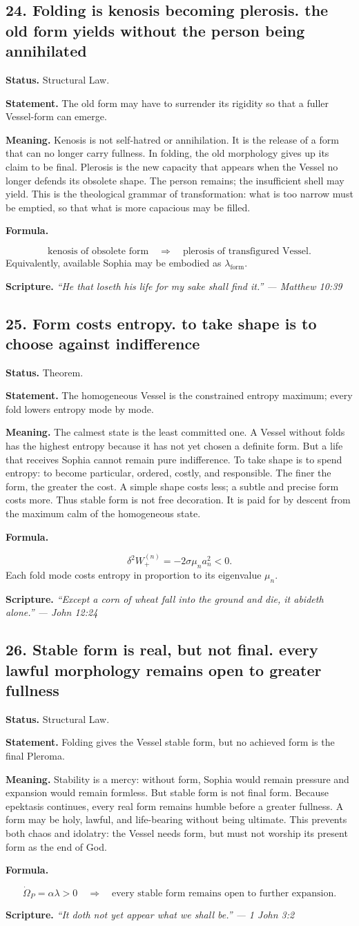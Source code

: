 \documentclass[11pt]{article}
\newcommand{\Op}{\Omega_P}
\newcommand{\lform}{\lambda_{\mathrm{form}}}
\newcommand{\thesis}[2]{%
  \subsection*{#1. #2}%
}
\newcommand{\status}[1]{\textbf{Status.} #1\par}
\newcommand{\statement}[1]{\textbf{Statement.} #1\par}
\newcommand{\explain}[1]{\textbf{Meaning.} #1\par}
\newcommand{\formula}[1]{\textbf{Formula.}\par #1\par}
\newcommand{\scripture}[2]{\textbf{Scripture.} {\small\itshape ``#1'' --- #2}\par}
\begin{document}
\thesis{24}{Folding is kenosis becoming plerosis. the old form yields without the person being annihilated}
\status{Structural Law.}
\statement{The old form may have to surrender its rigidity so that a fuller Vessel-form can emerge.}
\explain{Kenosis is not self-hatred or annihilation. It is the release of a form that can no longer carry fullness. In folding, the old morphology gives up its claim to be final. Plerosis is the new capacity that appears when the Vessel no longer defends its obsolete shape. The person remains; the insufficient shell may yield. This is the theological grammar of transformation: what is too narrow must be emptied, so that what is more capacious may be filled.}
\formula{\[
  \text{kenosis of obsolete form}
  \quad\Longrightarrow\quad
  \text{plerosis of transfigured Vessel}.
\]
Equivalently, available Sophia may be embodied as \(\lform\).}
\scripture{He that loseth his life for my sake shall find it.}{Matthew 10:39}


\thesis{25}{Form costs entropy. to take shape is to choose against indifference}
\status{Theorem.}
\statement{The homogeneous Vessel is the constrained entropy maximum; every fold lowers entropy mode by mode.}
\explain{The calmest state is the least committed one. A Vessel without folds has the highest entropy because it has not yet chosen a definite form. But a life that receives Sophia cannot remain pure indifference. To take shape is to spend entropy: to become particular, ordered, costly, and responsible. The finer the form, the greater the cost. A simple shape costs less; a subtle and precise form costs more. Thus stable form is not free decoration. It is paid for by descent from the maximum calm of the homogeneous state.}
\formula{\[
  \delta^2 W^{(n)}_+=-2\sigma\mu_n a_n^2<0.
\]
Each fold mode costs entropy in proportion to its eigenvalue \(\mu_n\).}
\scripture{Except a corn of wheat fall into the ground and die, it abideth alone.}{John 12:24}

\thesis{26}{Stable form is real, but not final. every lawful morphology remains open to greater fullness}
\status{Structural Law.}
\statement{Folding gives the Vessel stable form, but no achieved form is the final Pleroma.}
\explain{Stability is a mercy: without form, Sophia would remain pressure and expansion would remain formless. But stable form is not final form. Because epektasis continues, every real form remains humble before a greater fullness. A form may be holy, lawful, and life-bearing without being ultimate. This prevents both chaos and idolatry: the Vessel needs form, but must not worship its present form as the end of God.}
\formula{\[
  \dot\Op=\alpha\lambda>0
  \quad\Longrightarrow\quad
  \text{every stable form remains open to further expansion.}
\]}
\scripture{It doth not yet appear what we shall be.}{1 John 3:2}
\end{document}

